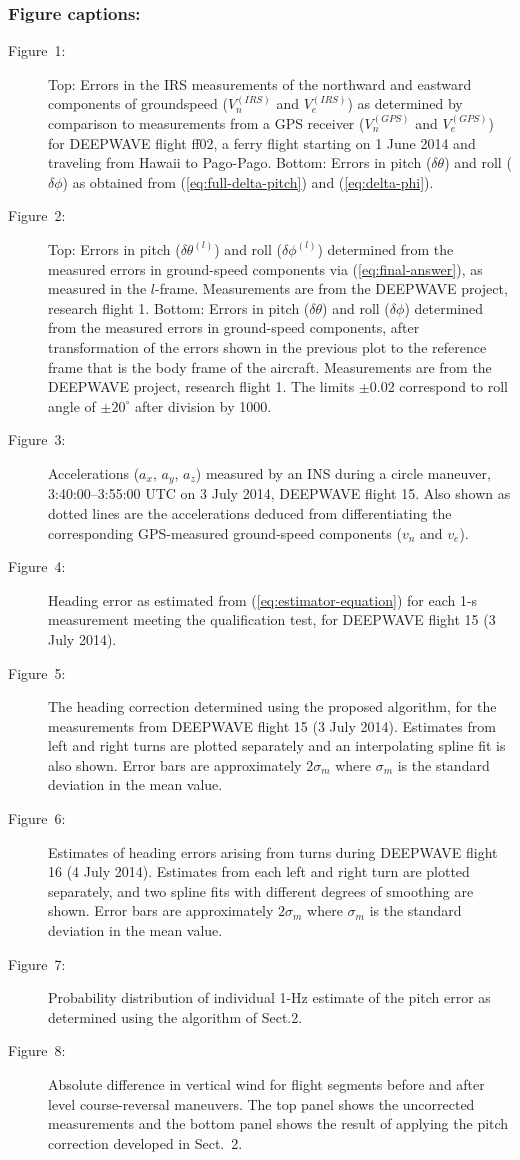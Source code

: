 \documentclass[english,british,amtd,bookmarks=false,unicode=true]{copernicus}\usepackage[]{graphicx}\usepackage[]{color}
\begin{document}
\subsubsection*{Figure captions:}
\begin{description}
\item [{Figure~1:}] Top: Errors in the IRS measurements of the northward and eastward components of groundspeed ($V_n^{(IRS)}$ and $V_e^{(IRS)}$) as determined by comparison to measurements from a GPS receiver ($V_n^{(GPS)}$ and $V_e^{(GPS)}$) for DEEPWAVE flight ff02, a ferry flight starting on 1 June 2014 and traveling from Hawaii to Pago-Pago. Bottom: Errors in pitch ($\delta\theta$) and roll ($\delta\phi$) as obtained from (\ref{eq:full-delta-pitch}) and (\ref{eq:delta-phi}).
\item [{Figure~2:}] Top: Errors in pitch ($\delta\theta^{(l)}$) and roll ($\delta\phi^{(l)}$) determined from the measured errors in ground-speed components via (\ref{eq:final-answer}), as measured in the $l$-frame. Measurements are from the DEEPWAVE project, research flight 1. Bottom: Errors in pitch ($\delta\theta$) and roll ($\delta\phi$) determined from the measured errors in ground-speed components, after transformation of the errors shown in the previous plot to the reference frame that is the body frame of the aircraft. Measurements are from the DEEPWAVE project, research flight 1. The limits $\pm$0.02 correspond to roll angle of $\pm 20^{\circ}$ after division by 1000.
\item [{Figure~3:}] Accelerations ($a_x$, $a_y$, $a_z$) measured by an INS during a circle maneuver, 3:40:00--3:55:00 UTC on 3 July 2014, DEEPWAVE flight 15. Also shown as dotted lines are the accelerations deduced from differentiating the corresponding GPS-measured ground-speed components ($v_n$ and $v_e$).
\item [{Figure~4:}] Heading error as estimated from (\ref{eq:estimator-equation}) for each 1-s measurement meeting the qualification test, for DEEPWAVE flight 15 (3 July 2014).
\item [{Figure~5:}] The heading correction determined using the proposed algorithm, for the measurements from DEEPWAVE flight 15 (3 July 2014). Estimates from left and right turns are plotted separately and an interpolating spline fit is also shown. Error bars are approximately $2\sigma_m$ where $\sigma_m$ is the standard deviation in the mean value.
\item [{Figure~6:}] Estimates of heading errors arising from turns during DEEPWAVE flight 16 (4 July 2014). Estimates from each left and right turn are plotted separately, and two spline fits with different degrees of smoothing are shown. Error bars are approximately $2\sigma_m$ where $\sigma_m$ is the standard deviation in the mean value.
\item [{Figure~7:}] Probability distribution of individual 1-Hz estimate of the pitch error as determined using the algorithm of Sect.2.
\item [{Figure~8:}] Absolute difference in vertical wind for flight segments before and after level course-reversal maneuvers. The top panel shows the uncorrected measurements and the bottom panel shows the result of applying the pitch correction developed in Sect.\ 2.
\end{description}
\end{document}
